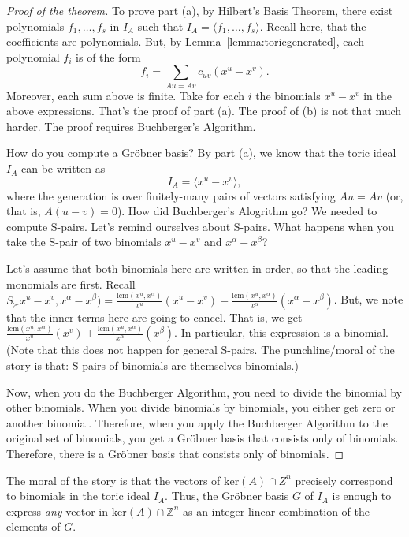 \begin{proof}[Proof of the theorem]
To prove part (a), by Hilbert's Basis Theorem, there exist polynomials $f_1,\ldots, f_s$ in $I_A$ such that $I_A = \langle f_1, \ldots, f_s \rangle$. Recall here, that the coefficients are polynomials. But, by Lemma~\ref{lemma:toricgenerated}, each polynomial $f_i$ is of the form
\[
f_i = \sum_{Au = Av} c_{uv}(x^u - x^v).
\]
Moreover, each sum above is finite. Take for each $i$ the binomials $x^u - x^v$ in the above expressions. That's the proof of part (a). The proof of (b) is not that much harder. The proof requires Buchberger's Algorithm.

How do you compute a Gr\"obner basis? By part (a), we know that the toric ideal $I_A$ can be written as
\[ I_A = \langle x^u - x^v \rangle, \]
where the generation is over finitely-many pairs of vectors satisfying $Au = Av$ (or, that is, $A(u-v) =0$). How did Buchberger's Alogrithm go? We needed to compute S-pairs. Let's remind ourselves about S-pairs. What happens when you take the S-pair of two binomials  $x^u - x^v$ and $x^\alpha - x^\beta$?

Let's assume that both binomials here are written in order, so that the leading monomials are first. 
Recall $S_\succ x^u - x^v,x^\alpha - x^\beta) = \frac{\text{lcm}(x^u,x^\alpha)}{x^u}(x^u - x^v) - \frac{\text{lcm}(x^u,x^\alpha)}{x^\alpha}(x^\alpha- x^\beta)$.
But, we note that the inner terms here are going to cancel. 
That is, we get $\frac{\text{lcm}(x^u,x^\alpha)}{x^u}(x^v) + \frac{\text{lcm}(x^u,x^\alpha)}{x^\alpha}(x^\beta)$. 
In particular, this expression is a binomial. (Note that this does not happen for general S-pairs. The punchline/moral of the story is that: S-pairs of binomials are themselves binomials.)

Now, when you do the Buchberger Algorithm, you need to divide the binomial by other binomials. When you divide binomials by binomials, you either get zero or another binomial. Therefore, when you apply the Buchberger Algorithm to the original set of binomials, you get a Gr\"obner basis that consists only of binomials. Therefore, there is a Gr\"obner basis that consists only of binomials.
\end{proof}

The moral of the story is that the vectors of $\text{ker}(A) \cap Z^n$ precisely correspond to binomials in the toric ideal $I_A$. Thus, the Gr\"obner basis $G$ of $I_A$ is enough to express \emph{any} vector in $\text{ker}(A) \cap \mathbb{Z}^n$ as an integer linear combination of the elements of $G$.


